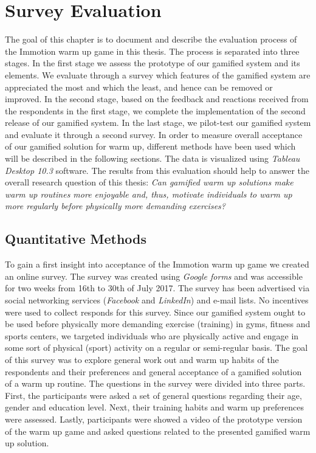 \chapter{Survey Evaluation}\label{chapter:survey_one}

The goal of this chapter is to document and describe the evaluation process of the Immotion warm up game in this thesis. The process is separated into three stages. In the first stage we assess the prototype of our gamified system and its elements. We evaluate through a survey which features of the gamified system are appreciated the most and which the least, and hence can be removed or improved. In the second stage, based on the feedback and reactions received from the respondents in the first stage, we complete the implementation of the second release of our gamified system. In the last stage, we pilot-test our gamified system and evaluate it through a second survey. 
In order to measure overall acceptance of our gamified solution for warm up, different methods have been used which will be described in the following sections.  The data is visualized using \textit{Tableau Desktop 10.3} software.  The results from this evaluation should help to answer the overall research question of this thesis: \textit{Can gamified warm up solutions make warm up routines more enjoyable and, thus, motivate individuals to warm up more regularly before physically more demanding exercises?}\pagebreak

\section{Quantitative Methods}
To gain a first insight into acceptance of the Immotion warm up game we created an online survey. The survey was created using \textit{Google forms} and was accessible for two weeks from 16th to 30th of July 2017. The survey has been advertised via social networking services (\textit{Facebook} and \textit{LinkedIn}) and e-mail lists. No incentives were used to collect responds for this survey. Since our gamified system ought to be used before physically more demanding exercise (training) in gyms, fitness and sports centers, we targeted individuals who are physically active and engage in some sort of physical (sport) activity on a regular or semi-regular basis. The goal of this survey was to explore general work out and warm up habits of the respondents and their preferences and general acceptance of a gamified solution of a warm up routine. The questions in the survey were divided into three parts. First, the participants were asked a set of general questions regarding their age, gender and education level. Next, their training habits and warm up preferences were assessed. Lastly, participants were showed a video of the prototype version of the warm up game and asked questions related to the presented gamified warm up solution. 

